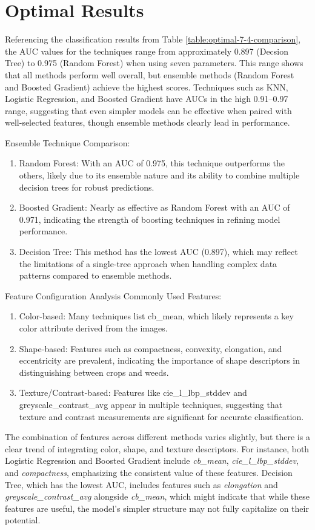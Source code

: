 \documentclass[letterpaper, notitlepage]{report}
\begin{document}
\section{Optimal Results}
Referencing the classification results from Table \ref{table:optimal-7-4-comparison}, the AUC values for the techniques range from approximately 0.897 (Decsion Tree) to 0.975 (Random Forest) when using seven parameters. This range shows that all methods perform well overall, but ensemble methods (Random Forest and Boosted Gradient) achieve the highest scores.
Techniques such as KNN, Logistic Regression, and Boosted Gradient have AUCs in the high 0.91–0.97 range, suggesting that even simpler models can be effective when paired with well-selected features, though ensemble methods clearly lead in performance.

Ensemble Technique Comparison:
\begin{enumerate}
	\item{Random Forest: With an AUC of 0.975, this technique outperforms the others, likely due to its ensemble nature and its ability to combine multiple decision trees for robust predictions.}
	\item{Boosted Gradient: Nearly as effective as Random Forest with an AUC of 0.971, indicating the strength of boosting techniques in refining model performance.}
	\item{Decision Tree: This method has the lowest AUC (0.897), which may reflect the limitations of a single-tree approach when handling complex data patterns compared to ensemble methods.}
\end{enumerate}

Feature Configuration Analysis
Commonly Used Features:
\begin{enumerate}
	\item{Color-based: Many techniques list cb\_mean, which likely represents a key color attribute derived from the images.}
	\item{Shape-based: Features such as compactness, convexity, elongation, and eccentricity are prevalent, indicating the importance of shape descriptors in distinguishing between crops and weeds.}
	\item{Texture/Contrast-based: Features like cie\_l\_lbp\_stddev and greyscale\_contrast\_avg appear in multiple techniques, suggesting that texture and contrast measurements are significant for accurate classification.}
\end{enumerate}

The combination of features across different methods varies slightly, but there is a clear trend of integrating color, shape, and texture descriptors. For instance, both Logistic Regression and Boosted Gradient include \textit{cb\_mean}, \textit{cie\_l\_lbp\_stddev}, and \textit{compactness}, emphasizing the consistent value of these features.
Decision Tree, which has the lowest AUC, includes features such as \textit{elongation} and \textit{greyscale\_contrast\_avg} alongside \textit{cb\_mean}, which might indicate that while these features are useful, the model’s simpler structure may not fully capitalize on their potential.
\end{document}
